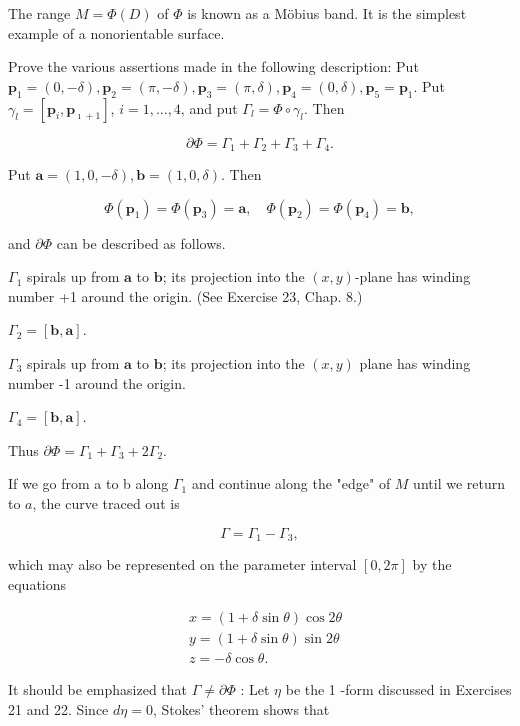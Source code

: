 \documentclass[10pt]{article}
\begin{document}
The range $M=\Phi(D)$ of $\Phi$ is known as a Möbius band. It is the simplest example of a nonorientable surface.

Prove the various assertions made in the following description: Put $\mathbf{p}_{1}=(0,-\delta), \mathbf{p}_{2}=(\pi,-\delta), \mathbf{p}_{3}=(\pi, \delta), \mathbf{p}_{4}=(0, \delta), \mathbf{p}_{5}=\mathbf{p}_{1}$. Put $\gamma_{l}=\left[\mathbf{p}_{i}, \mathbf{p}_{\imath+1}\right]$, $i=1, \ldots, 4$, and put $\Gamma_{l}=\Phi \circ \gamma_{l}$. Then

$$
\partial \Phi=\Gamma_{1}+\Gamma_{2}+\Gamma_{3}+\Gamma_{4} .
$$

Put $\mathbf{a}=(1,0,-\delta), \mathbf{b}=(1,0, \delta)$. Then

$$
\Phi\left(\mathbf{p}_{1}\right)=\Phi\left(\mathbf{p}_{3}\right)=\mathbf{a}, \quad \Phi\left(\mathbf{p}_{2}\right)=\Phi\left(\mathbf{p}_{4}\right)=\mathbf{b},
$$

and $\partial \Phi$ can be described as follows.

$\Gamma_{1}$ spirals up from $\mathbf{a}$ to $\mathbf{b}$; its projection into the $(x, y)$-plane has winding number +1 around the origin. (See Exercise 23, Chap. 8.)

$\Gamma_{2}=[\mathbf{b}, \mathbf{a}]$.

$\Gamma_{3}$ spirals up from $\mathbf{a}$ to $\mathbf{b}$; its projection into the $(x, y)$ plane has winding number -1 around the origin.

$\Gamma_{4}=[\mathbf{b}, \mathbf{a}]$.

Thus $\partial \Phi=\Gamma_{1}+\Gamma_{3}+2 \Gamma_{2}$.

If we go from a to b along $\Gamma_{1}$ and continue along the "edge" of $M$ until we return to $a$, the curve traced out is

$$
\Gamma=\Gamma_{1}-\Gamma_{3},
$$

which may also be represented on the parameter interval $[0,2 \pi]$ by the equations

$$
\begin{aligned}
& x=(1+\delta \sin \theta) \cos 2 \theta \\
& y=(1+\delta \sin \theta) \sin 2 \theta \\
& z=-\delta \cos \theta .
\end{aligned}
$$

It should be emphasized that $\Gamma \neq \partial \Phi$ : Let $\eta$ be the 1 -form discussed in Exercises 21 and 22. Since $d \eta=0$, Stokes' theorem shows that
\end{document}
